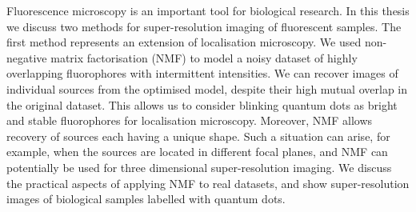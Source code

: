 %
%
%
%
%
%
%

%
%
%
%
Fluorescence microscopy is an important tool for biological research. In this thesis we discuss two methods for super-resolution imaging of fluorescent samples. The first method represents an extension of localisation microscopy. We used non-negative matrix factorisation (NMF) to model a noisy dataset of highly overlapping fluorophores with intermittent intensities. We can recover images of individual sources from the optimised model, despite their high mutual overlap in the original dataset. This allows us to consider blinking quantum dots as bright and stable fluorophores for localisation microscopy. Moreover, NMF allows recovery of sources each having a unique shape. Such a situation can arise, for example, when the sources are located in different focal planes, and NMF can potentially be used for three dimensional super-resolution imaging. We discuss the practical aspects of applying NMF to real datasets, and show super-resolution images of biological samples labelled with quantum dots.

